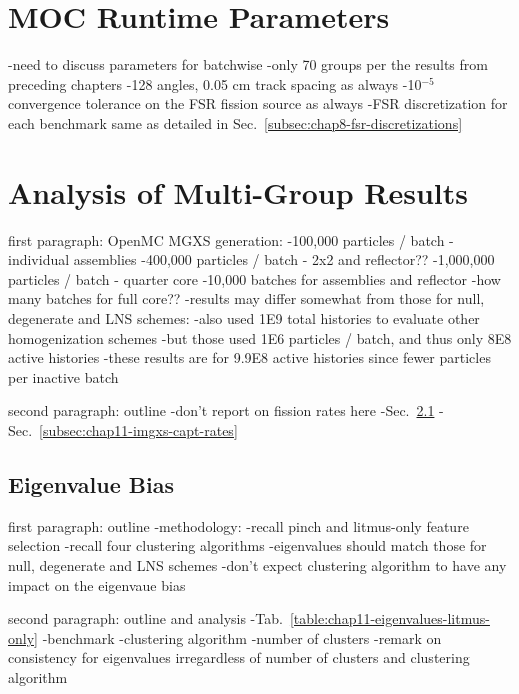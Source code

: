 \section{MOC Runtime Parameters}
\label{sec:chap11-moc-params}

-need to discuss parameters for batchwise 
-only 70 groups per the results from preceding chapters
-128 angles, 0.05 cm track spacing as always
-10$^{-5}$ convergence tolerance on the \ac{FSR} fission source as always
-FSR discretization for each benchmark same as detailed in Sec.~\ref{subsec:chap8-fsr-discretizations}

\section{Analysis of Multi-Group Results}
\label{subsec:chap11-imgxs-bias}

first paragraph: OpenMC MGXS generation:
-100,000 particles / batch - individual assemblies
-400,000 particles / batch - 2x2 and reflector??
-1,000,000 particles / batch - quarter core
-10,000 batches for assemblies and reflector
-how many batches for full core??
-results may differ somewhat from those for null, degenerate and LNS schemes:
  -also used 1E9 total histories to evaluate other homogenization schemes
  -but those used 1E6 particles / batch, and thus only 8E8 active histories
  -these results are for 9.9E8 active histories since fewer particles per inactive batch

second paragraph: outline
-don't report on fission rates here
-Sec.~\ref{subsec:chap11-imgxs-eigenvalue-bias}
-Sec.~\ref{subsec:chap11-imgxs-capt-rates}

\subsection{Eigenvalue Bias}
\label{subsec:chap11-imgxs-eigenvalue-bias}

first paragraph: outline
-methodology:
  -recall pinch and litmus-only feature selection
  -recall four clustering algorithms
-eigenvalues should match those for null, degenerate and LNS schemes
  -don't expect clustering algorithm to have any impact on the eigenvaue bias

second paragraph: outline and analysis
-Tab.~\ref{table:chap11-eigenvalues-litmus-only}
  -benchmark
  -clustering algorithm
  -number of clusters
-remark on consistency for eigenvalues irregardless of number of clusters and clustering algorithm

